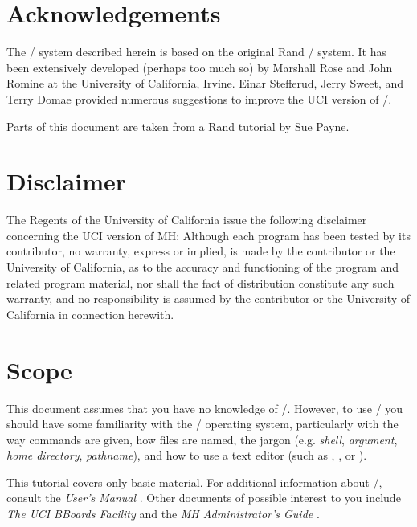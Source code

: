 
\banner

\section{Acknowledgements}
The \MH/ system described herein is based on the original Rand \MH/ system.
It has been extensively developed (perhaps too much so) by Marshall Rose and
John Romine at the University of California, Irvine.
Einar Stefferud, Jerry Sweet, and Terry Domae provided numerous suggestions
to improve the UCI version of \MH/.

Parts of this document are taken from a Rand tutorial \cite{SPayn85} by
Sue Payne.

\section{Disclaimer}
The Regents of the University of California issue the following
disclaimer concerning the UCI version of MH:
\bigquote
Although each program has been tested by its contributor,
no warranty, express or implied,
is made by the contributor or the University of California,
as to the accuracy and functioning of the program
and related program material,
nor shall the fact of distribution constitute any such warranty,
and no responsibility is assumed by the contributor
or the University of California in connection herewith.
\endbigquote

\section{Scope}
This document assumes that you have no knowledge of \MH/.
However, to use \MH/ you should have some familiarity with the \unix/ 
operating system,
particularly with the way commands are given,
how files are named,
the jargon (e.g. {\it shell}, {\it argument}, {\it home directory},
{\it pathname\/}),
and how to use a text editor (such as , , or ).

This tutorial covers only basic material.
For additional information about \MH/,
consult the {\it User's Manual} \cite{MRose85a}.
Other documents of possible interest to you include
{\it The UCI BBoards Facility} \cite{MRose84}
and
the {\it MH Administrator's Guide} \cite{MRose85b}.

